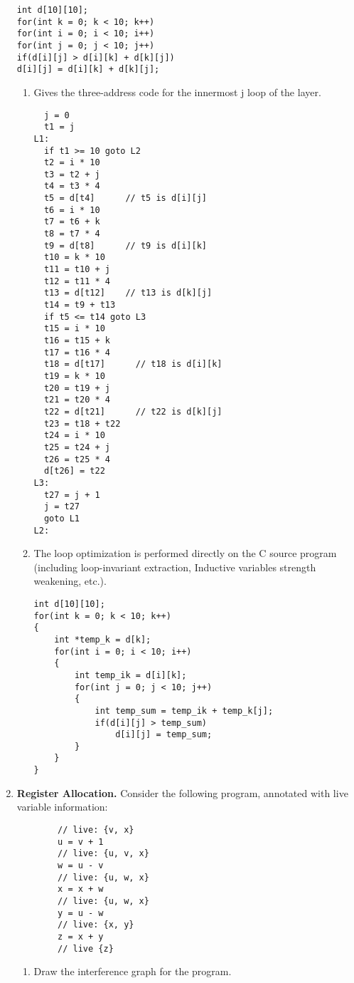 \documentclass[10pt]{article}
\begin{document}
\begin{enumerate}
        \begin{verbatim}
int d[10][10];
for(int k = 0; k < 10; k++)
for(int i = 0; i < 10; i++)
for(int j = 0; j < 10; j++)
if(d[i][j] > d[i][k] + d[k][j])
d[i][j] = d[i][k] + d[k][j];
    \end{verbatim}
        \begin{enumerate}
          \item Gives the three-address code for the innermost j loop of the layer.
                \begin{verbatim}
  j = 0
  t1 = j
L1:
  if t1 >= 10 goto L2
  t2 = i * 10
  t3 = t2 + j
  t4 = t3 * 4
  t5 = d[t4]      // t5 is d[i][j]
  t6 = i * 10
  t7 = t6 + k
  t8 = t7 * 4
  t9 = d[t8]      // t9 is d[i][k]
  t10 = k * 10
  t11 = t10 + j
  t12 = t11 * 4
  t13 = d[t12]    // t13 is d[k][j]
  t14 = t9 + t13
  if t5 <= t14 goto L3
  t15 = i * 10
  t16 = t15 + k
  t17 = t16 * 4
  t18 = d[t17]      // t18 is d[i][k]
  t19 = k * 10
  t20 = t19 + j
  t21 = t20 * 4
  t22 = d[t21]      // t22 is d[k][j]
  t23 = t18 + t22
  t24 = i * 10
  t25 = t24 + j
  t26 = t25 * 4
  d[t26] = t22
L3:
  t27 = j + 1
  j = t27 
  goto L1
L2:
\end{verbatim}
          \item The loop optimization is performed directly on the C source program (including loop-invariant
                extraction, Inductive variables strength weakening, etc.).
                \begin{verbatim}
int d[10][10];
for(int k = 0; k < 10; k++)
{
    int *temp_k = d[k];
    for(int i = 0; i < 10; i++)
    {
        int temp_ik = d[i][k];
        for(int j = 0; j < 10; j++)
        {
            int temp_sum = temp_ik + temp_k[j];
            if(d[i][j] > temp_sum)
                d[i][j] = temp_sum;
        }
    }
}
                      \end{verbatim}
        \end{enumerate}
  \item \textbf{Register Allocation. } Consider the following program, annotated with live variable information:
        \begin{verbatim}
        // live: {v, x}
        u = v + 1
        // live: {u, v, x}
        w = u - v
        // live: {u, w, x}
        x = x + w
        // live: {u, w, x}
        y = u - w
        // live: {x, y}
        z = x + y
        // live {z}
    \end{verbatim}
        \begin{enumerate}
          \item Draw the interference graph for the program.

\end{enumerate}
\end{enumerate}
\end{document}
